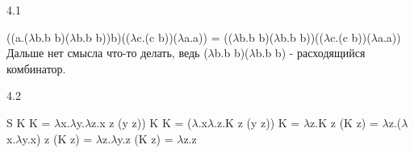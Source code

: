 \documentclass{article}
\begin{document}
4.1

((a.($\lambda$b.b b)($\lambda$b.b b))b)(($\lambda$c.(c b))($\lambda$a.a)) = (($\lambda$b.b b)($\lambda$b.b b))(($\lambda$c.(c b))($\lambda$a.a))
Дальше нет смысла что-то делать, ведь ($\lambda$b.b b)($\lambda$b.b b) - расходящийся комбинатор.
$$$$

4.2

S K K = $\lambda$x.$\lambda$y.$\lambda$z.x z (y z)) K K = ($\lambda$.x$\lambda$.z.K z (y z)) K = $\lambda$z.K z (K z) = $\lambda$z.($\lambda$x.$\lambda$y.x) z (K z) =
$\lambda$z.$\lambda$y.z (K z) = $\lambda$z.z
\end{document}

